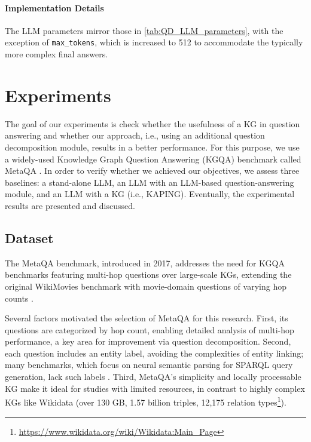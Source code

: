 \documentclass[pdflatex,sn-mathphys-num]{sn-jnl}%
\theoremstyle{thmstyleone}%
\theoremstyle{thmstyletwo}%
\theoremstyle{thmstylethree}%
\begin{document}
\paragraph{Implementation Details}  
The LLM parameters mirror those in \autoref{tab:QD_LLM_parameters}, with the exception of \texttt{max\_tokens}, which is increased to 512 to accommodate the typically more complex final answers.

\section{Experiments}
\label{sec:experiments}
The goal of our experiments is check whether the usefulness of a KG in question answering and whether our approach, i.e., using an additional question decomposition module, results in a better performance.
For this purpose, we use a widely-used Knowledge Graph Question Answering (KGQA) benchmark called MetaQA \cite{Zhang}. In order to verify whether we achieved our objectives, we assess three baselines: a stand-alone LLM, an LLM with an LLM-based question-answering module, and an LLM with a KG (i.e., KAPING).
Eventually, the experimental results are presented and discussed.


\subsection{Dataset}
\label{sec:benchmark}
The MetaQA benchmark, introduced in 2017, addresses the need for KGQA benchmarks featuring multi-hop questions over large-scale KGs, extending the original WikiMovies benchmark with movie-domain questions of varying hop counts \cite{Zhang}.

Several factors motivated the selection of MetaQA for this research. First, its questions are categorized by hop count, enabling detailed analysis of multi-hop performance, a key area for improvement via question decomposition. Second, each question includes an entity label, avoiding the complexities of entity linking; many benchmarks, which focus on neural semantic parsing for SPARQL query generation, lack such labels \cite{KGQA_benchmarks}. Third, MetaQA’s simplicity and locally processable KG make it ideal for studies with limited resources, in contrast to highly complex KGs like Wikidata (over 130 GB, 1.57 billion triples, 12,175 relation types\footnote{\url{https://www.wikidata.org/wiki/Wikidata:Main_Page}}).
\end{document}
